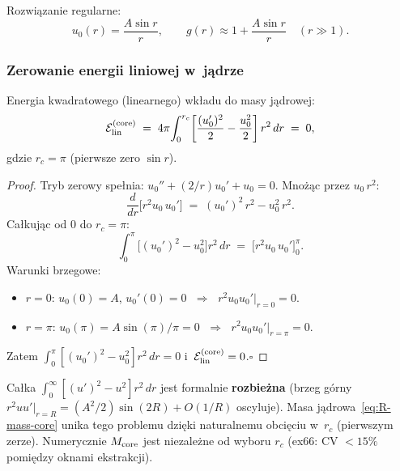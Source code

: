 Rozwi\k{a}zanie regularne:
\begin{equation}\label{eq:R-zero-mode}
  u_0(r) = \frac{A\sin r}{r},
  \qquad
  g(r) \approx 1 + \frac{A\sin r}{r}
  \quad (r \gg 1).
\end{equation}

\subsubsection{Zerowanie energii liniowej w~j\k{a}drze}

\begin{proposition}\label{prop:R-Elin-zero}
Energia kwadratowego (linearnego) wk\l{}adu do masy j\k{a}drowej:
\begin{equation}\label{eq:R-Elin}
  \mathcal{E}_{\rm lin}^{(\rm core)}
  \;=\; 4\pi\!\int_0^{r_c}\!\left[
    \frac{(u_0')^2}{2} - \frac{u_0^2}{2}
  \right]r^2\,dr
  \;=\; 0,
\end{equation}
gdzie $r_c = \pi$ (pierwsze zero $\sin r$).
\end{proposition}

\begin{proof}
Tryb zerowy spe\l{}nia: $u_0'' + (2/r)u_0' + u_0 = 0$.
Mno\.z\k{a}c przez $u_0\,r^2$:
\begin{equation}\label{eq:R-virial}
  \frac{d}{dr}\!\bigl[r^2 u_0\,u_0'\bigr]
  \;=\; (u_0')^2\,r^2 - u_0^2\,r^2.
\end{equation}
Ca\l{}kuj\k{a}c od $0$ do $r_c = \pi$:
\begin{equation}
  \int_0^\pi\!\bigl[(u_0')^2 - u_0^2\bigr]r^2\,dr
  \;=\; \bigl[r^2 u_0\,u_0'\bigr]_0^\pi.
\end{equation}
Warunki brzegowe:
\begin{itemize}[nosep]
  \item $r = 0$: $u_0(0) = A$, $u_0'(0) = 0$
    $\;\Longrightarrow\;$ $r^2 u_0 u_0'\big|_{r=0} = 0$.
  \item $r = \pi$: $u_0(\pi) = A\sin(\pi)/\pi = 0$
    $\;\Longrightarrow\;$ $r^2 u_0 u_0'\big|_{r=\pi} = 0$.
\end{itemize}
Zatem $\int_0^\pi[(u_0')^2 - u_0^2]r^2\,dr = 0$
i~$\mathcal{E}_{\rm lin}^{(\rm core)} = 0$.\hfill$\square$
\end{proof}

\begin{remark}%
\label{rem:R-core-vs-full}
Ca\l{}ka $\int_0^\infty[(u')^2 - u^2]r^2\,dr$ jest formalnie
\textbf{rozbie\.zna} (brzeg g\'orny $r^2 u u'|_{r=R}
= (A^2/2)\sin(2R) + O(1/R)$ oscyluje).
Masa j\k{a}drowa~\eqref{eq:R-mass-core} unika tego problemu
dzi\k{e}ki naturalnemu obci\k{e}ciu w~$r_c$ (pierwszym zerze).
Numerycznie $M_{\rm core}$ jest niezale\.zne od wyboru $r_c$
(ex66: CV $< 15\%$ pomi\k{e}dzy oknami ekstrakcji).
\end{remark}

